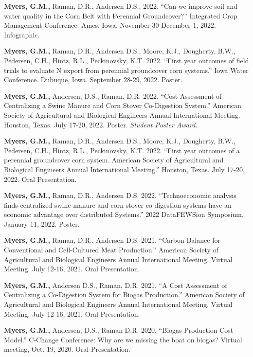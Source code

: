 \begin{cvparagraph}
    \textbf{Myers, G.M., }Raman, D.R., Andersen D.S., 2022. “Can we improve soil and water quality in the Corn Belt with Perennial Groundcover?” Integrated Crop Management Conference. Ames, Iowa. November 30-December 1, 2022. Infographic.
   
  \textbf{Myers, G.M., }Raman, D.R.,  Andersen D.S., Moore, K.J., Dougherty, B.W., Pedersen, C.H., Hintz, R.L., Peckinovsky, K.T. 2022. “First year outcomes of field trials to evaluate N export from perennial groundcover corn systems.” Iowa Water Conference. Dubuque, Iowa. September 28-29, 2022. Poster.

  \textbf{Myers, G.M., }Andersen, D.S., Raman, D.R. 2022. “Cost Assessment of Centralizing a Swine Manure and Corn Stover Co-Digestion System.” American Society of Agricultural and Biological Engineers Annual International Meeting. Houston, Texas. July 17-20, 2022. Poster. \color{awesome}\textit{Student Poster Award.}\color{darktext}

  \textbf{Myers, G.M., }Raman, D.R.,  Andersen D.S., Moore, K.J., Dougherty, B.W., Pedersen, C.H., Hintz, R.L., Peckinovsky, K.T. 2022. “First year outcomes of a perennial groundcover corn system. American Society of Agricultural and Biological Engineers Annual International Meeting.” Houston, Texas. July 17-20, 2022. Oral Presentation.

  \textbf{Myers, G.M., }Raman, D.R.,  Andersen D.S. 2022. “Technoeconomic analysis finds centralized swine manure and corn stover co-digestion systems have an economic advantage over distributed Systems.” 2022 DataFEWSion Symposium. January 11, 2022. Poster.

  \textbf{Myers, G.M., }Raman, D.R.,  Andersen D.S. 2021. “Carbon Balance for Conventional and Cell-Cultured Meat Production.” American Society of Agricultural and Biological Engineers Annual International Meeting. Virtual Meeting. July 12-16, 2021. Oral Presentation.

  \textbf{Myers, G.M., }Andersen D.S., Raman, D.R. 2021. “A Cost Assessment of Centralizing a Co-Digestion System for Biogas Production.” American Society of Agricultural and Biological Engineers Annual International Meeting. Virtual Meeting. July 12-16, 2021. Oral Presentation.

  \textbf{Myers, G.M., }Andersen, D.S., Raman D.R. 2020. “Biogas Production Cost Model.” C-Change Conference: Why are we missing the boat on biogas? Virtual meeting, Oct. 19, 2020. Oral Presentation.

  


\end{cvparagraph}